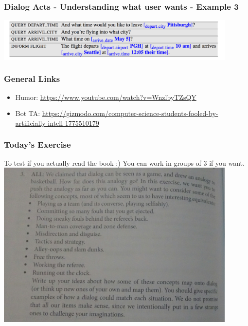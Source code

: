 \documentclass{beamer}
\begin{document}
\begin{frame}
\frametitle{Dialog Acts - Understanding what user wants - Example 3}
\includegraphics[width=0.9\textwidth]{dialogact3.png}
\end{frame}

\begin{frame}
\frametitle{General Links}
\begin{itemize}
\item Humor: \url{https://www.youtube.com/watch?v=WnzlbyTZsQY}
\item Bot TA: \url{https://gizmodo.com/computer-science-students-fooled-by-artificially-intell-1775510179}
\end{itemize}
\end{frame}
%

\begin{frame}
\frametitle{Today's Exercise}
To test if you actually read the book :) You can work in groups of 3 if you want. 
\includegraphics[width=0.9\textwidth]{question.jpg}
\end{frame}
\end{document}
